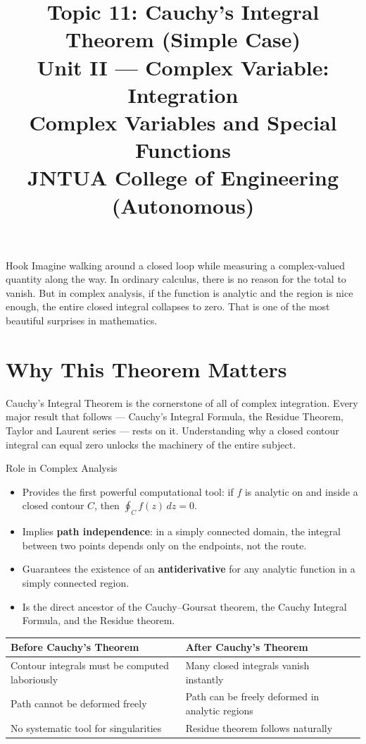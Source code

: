 \documentclass[12pt,a4paper]{article}
\title{\textbf{Topic 11: Cauchy's Integral Theorem (Simple Case)}\\
\large Unit II --- Complex Variable: Integration\\
Complex Variables and Special Functions\\
JNTUA College of Engineering (Autonomous)}
\author{}
\date{}
\begin{document}
\maketitle
\tableofcontents
\newpage

\begin{curiositybox}{Hook}
Imagine walking around a closed loop while measuring a complex-valued quantity along the way.
In ordinary calculus, there is no reason for the total to vanish.
But in complex analysis, if the function is analytic and the region is nice enough,
the entire closed integral collapses to zero.
That is one of the most beautiful surprises in mathematics.
\end{curiositybox}

\section{Why This Theorem Matters}

Cauchy's Integral Theorem is the cornerstone of all of complex integration.
Every major result that follows --- Cauchy's Integral Formula, the Residue Theorem,
Taylor and Laurent series --- rests on it.
Understanding why a closed contour integral can equal zero unlocks the machinery of
the entire subject.

\begin{infobox}{Role in Complex Analysis}
\begin{itemize}
  \item Provides the first powerful computational tool: if $f$ is analytic on and inside a closed contour $C$, then
        $\oint_{C} f(z)\,dz = 0$.
  \item Implies \textbf{path independence}: in a simply connected domain, the integral between two points
        depends only on the endpoints, not the route.
  \item Guarantees the existence of an \textbf{antiderivative} for any analytic function in a simply connected region.
  \item Is the direct ancestor of the Cauchy--Goursat theorem, the Cauchy Integral Formula, and the Residue theorem.
\end{itemize}
\end{infobox}

\begin{center}
\begin{tabular}{lll}
\toprule
\textbf{Before Cauchy's Theorem} & \textbf{After Cauchy's Theorem} \\
\midrule
Contour integrals must be computed laboriously & Many closed integrals vanish instantly \\
Path cannot be deformed freely & Path can be freely deformed in analytic regions \\
No systematic tool for singularities & Residue theorem follows naturally \\
\bottomrule
\end{tabular}
\end{center}
\end{document}

